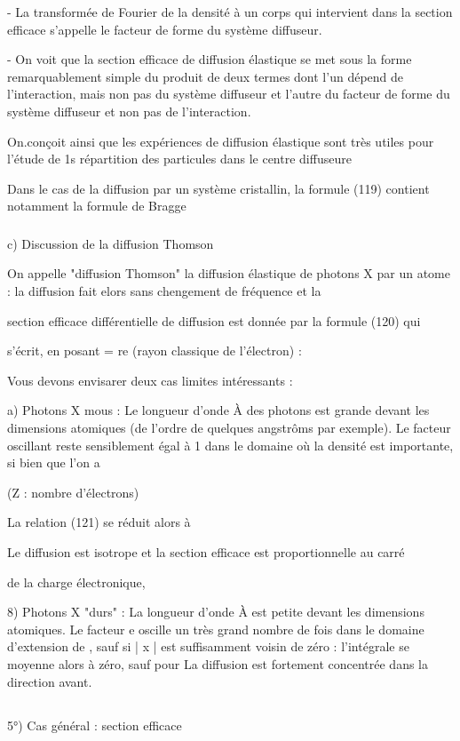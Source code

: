 {{{- La transformée de Fourier de la densité à un corps qui intervient dans la
section efficace s'appelle le facteur de forme du système diffuseur.

- On voit que la section efficace de diffusion élastique se met sous la forme
remarquablement simple du produit de deux termes dont l'un dépend de l'interaction,
mais non pas du système diffuseur et l'autre du facteur de forme
du système diffuseur et non pas de l'interaction.

On.conçoit ainsi que les expériences de diffusion élastique sont
très utiles pour l'étude de 1s répartition des particules dans le centre diffuseure

Dans le cas de la diffusion par un système cristallin, la formule
(119) contient notamment la formule de Bragge
\subsubsection{}%
c) Discussion de la diffusion Thomson

On appelle "diffusion Thomson" la diffusion élastique de photons X
par un atome : la diffusion  fait elors sans chengement de fréquence et la

section efficace différentielle de diffusion est donnée par la formule (120) qui

s'écrit, en posant = re (rayon classique de l'électron) :

% 
Vous devons envisarer deux cas limites intéressants :

a) Photons X mous : Le longueur d'onde À des photons est
grande devant les dimensions atomiques (de l'ordre de quelques angstrôms
par exemple). Le facteur oscillant  reste sensiblement égal à 1 dans
le domaine où la densité est importante, si bien que l'on a

 (Z : nombre d'électrons)

La relation (121) se réduit alors à

Le diffusion est isotrope et la section efficace est proportionnelle au carré

de la charge électronique,

8) Photons X "durs" : La longueur d'onde À est petite devant les
dimensions atomiques. Le facteur e oscille un très grand nombre de fois
dans le domaine d'extension de , sauf si | x | est suffisamment voisin
de zéro : l'intégrale  se moyenne alors à zéro, sauf pour
La diffusion est fortement concentrée dans la direction avant.

\subsection{}%
5°) Cas général : section efficace
}}}
